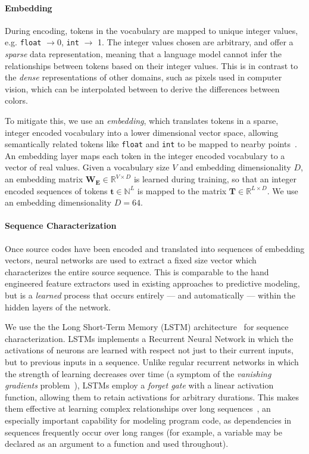 

\paragraph{Embedding} During encoding, tokens in the vocabulary are mapped to
unique integer values, e.g. \texttt{float} $\rightarrow 0$, \texttt{int}
$\rightarrow$ 1. The integer values chosen are arbitrary, and offer a
\emph{sparse} data representation, meaning that a language model cannot infer
the relationships between tokens based on their integer values. This is in
contrast to the \emph{dense} representations of other domains, such as pixels
used in computer vision, which can be interpolated between to derive the
differences between colors.

To mitigate this, we use an \emph{embedding}, which translates tokens in a
sparse, integer encoded vocabulary into a lower dimensional vector space,
allowing semantically related tokens like \texttt{float} and \texttt{int} to be
mapped to nearby points~\cite{Mikolov2013a,Baroni2014}. An embedding layer maps
each token in the integer encoded vocabulary to a vector of real values. Given a
vocabulary size $V$ and embedding dimensionality $D$, an embedding matrix
$\bm{W_{E}} \in \mathbb{R}^{V \times D}$ is learned during training, so that an
integer encoded sequences of tokens $\bm{t} \in \mathbb{N}^{L}$ is mapped to the
matrix $\bm{T} \in \mathbb{R}^{L \times D}$. We use an embedding dimensionality
$D = 64$.

\paragraph{Sequence Characterization} Once source codes have been encoded and
translated into sequences of embedding vectors, neural networks are used to
extract a fixed size vector which characterizes the entire source sequence. This
is comparable to the hand engineered feature extractors used in existing
approaches to predictive modeling, but is a \emph{learned} process that occurs
entirely --- and automatically --- within the hidden layers of the network.

We use the the Long Short-Term Memory (LSTM) architecture~\cite{Hochreiter1997}
for sequence characterization. LSTMs implements a Recurrent Neural Network in
which the activations of neurons are learned with respect not just to their
current inputs, but to previous inputs in a sequence. Unlike regular recurrent
networks in which the strength of learning decreases over time (a symptom of the
\emph{vanishing gradients} problem~\cite{Pacanu2013}), LSTMs employ a
\emph{forget gate} with a linear activation function, allowing them to retain
activations for arbitrary durations. This makes them effective at learning
complex relationships over long sequences~\cite{Lipton2015}, an especially
important capability for modeling program code, as dependencies in sequences
frequently occur over long ranges (for example, a variable may be declared as an
argument to a function and used throughout).

